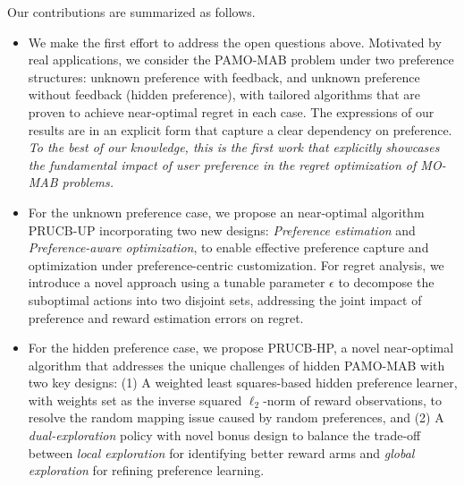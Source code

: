 Our contributions are summarized as follows.
\begin{itemize}[leftmargin=*]
\item
We make the first effort to address the open questions above. 
Motivated by real applications, we consider the PAMO-MAB problem under two preference structures: unknown preference with feedback, and unknown preference without feedback (hidden preference), with tailored algorithms that are proven to achieve near-optimal regret in each case.
The expressions of our results are in an explicit form that capture a clear dependency on preference.
\emph{To the best of our knowledge, this is the first work that explicitly showcases the fundamental impact of user preference in the regret optimization of MO-MAB problems.}

\item 
For the unknown preference case, we propose an near-optimal algorithm PRUCB-UP incorporating two new designs: \emph{Preference estimation} and \emph{Preference-aware optimization}, to enable effective preference capture and optimization under preference-centric customization.
For regret analysis, we introduce a novel approach using a tunable parameter $\epsilon$ to decompose the suboptimal actions into two disjoint sets, addressing the joint impact of preference and reward estimation errors on regret.


\item 
For the hidden preference case, we propose PRUCB-HP, a novel near-optimal algorithm that addresses the unique challenges of hidden PAMO-MAB with two key designs: (1) A weighted least squares-based hidden preference learner, with weights set as the inverse squared $\ell_2$-norm of reward observations, to resolve the random mapping issue caused by random preferences, and (2) A \emph{dual-exploration} policy with novel bonus design to balance the trade-off between \emph{local exploration} for identifying better reward arms and \emph{global exploration} for refining preference learning.




\end{itemize}
